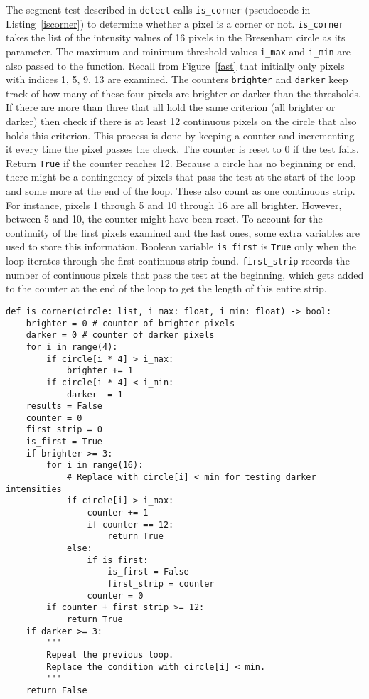 The segment test described in \texttt{detect} calls \texttt{is\_corner} (pseudocode in Listing~\ref{iscorner}) to determine whether a pixel is a corner or not. \texttt{is\_corner} takes the list of the intensity values of 16 pixels in the Bresenham circle as its parameter.  The maximum and minimum threshold values \texttt{i\_max} and \texttt{i\_min} are also passed to the function. Recall from Figure~\ref{fast} that initially only pixels with indices 1, 5, 9, 13 are examined. The counters \texttt{brighter} and \texttt{darker} keep track of how many of these four pixels are brighter or darker than the thresholds. If there are more than three that all hold the same criterion (all brighter or darker) then check if there is at least 12 continuous pixels on the circle that also holds this criterion. This process is done by keeping a counter and incrementing it every time the pixel passes the check. The counter is reset to 0 if the test fails. Return \texttt{True} if the counter reaches 12. Because a circle has no beginning or end, there might be a contingency of pixels that pass the test at the start of the loop and some more at the end of the loop. These also count as one continuous strip. For instance, pixels 1 through 5 and 10 through 16 are all brighter. However, between 5 and 10, the counter might have been reset. To account for the continuity of the first pixels examined and the last ones, some extra variables are used to store this information. Boolean variable \texttt{is\_first} is \texttt{True} only when the loop iterates through the first continuous strip found. \texttt{first\_strip} records the number of continuous pixels that pass the test at the beginning, which gets added to the counter at the end of the loop to get the length of this entire strip.

\begin{lstlisting}[mathescape, caption= Check for corner at pixel with given Bresenham circle, label=iscorner]
def is_corner(circle: list, i_max: float, i_min: float) -> bool:
    brighter = 0 # counter of brighter pixels
    darker = 0 # counter of darker pixels
    for i in range(4):
        if circle[i * 4] > i_max:
            brighter += 1
        if circle[i * 4] < i_min:
            darker -= 1
    results = False
    counter = 0
    first_strip = 0
    is_first = True
    if brighter >= 3:
        for i in range(16):    
            # Replace with circle[i] < min for testing darker intensities
            if circle[i] > i_max: 
                counter += 1
                if counter == 12:
                    return True
            else:
                if is_first:
                    is_first = False
                    first_strip = counter
                counter = 0
        if counter + first_strip >= 12:
            return True
    if darker >= 3:
        '''
        Repeat the previous loop. 
        Replace the condition with circle[i] < min.
        '''
    return False
\end{lstlisting}

